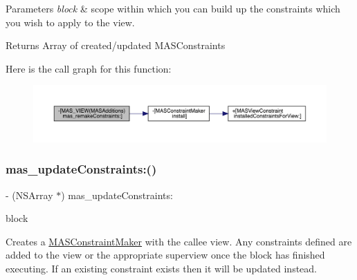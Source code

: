 \begin{DoxyParams}{Parameters}
{\em block} & scope within which you can build up the constraints which you wish to apply to the view.\\
\hline
\end{DoxyParams}
\begin{DoxyReturn}{Returns}
Array of created/updated M\+A\+S\+Constraints 
\end{DoxyReturn}
Here is the call graph for this function\+:\nopagebreak
\begin{figure}[H]
\begin{center}
\leavevmode
\includegraphics[width=350pt]{category_m_a_s___v_i_e_w_07_m_a_s_additions_08_a694b415beed5f32c5d1215f988bca6d0_cgraph}
\end{center}
\end{figure}
\mbox{\label{category_m_a_s___v_i_e_w_07_m_a_s_additions_08_a7e717094d6073368dc2d3e8a56377e84}} 
\subsubsection{\texorpdfstring{mas\+\_\+update\+Constraints\+:()}{mas\_updateConstraints:()}}
{\footnotesize\ttfamily -\/ (N\+S\+Array $\ast$) mas\+\_\+update\+Constraints\+: \begin{DoxyParamCaption}\item[{(void($^\wedge$)(\mbox{\hyperlink{interface_m_a_s_constraint_maker}{M\+A\+S\+Constraint\+Maker}} $\ast$make))}]{block }\end{DoxyParamCaption}}

Creates a \mbox{\hyperlink{interface_m_a_s_constraint_maker}{M\+A\+S\+Constraint\+Maker}} with the callee view. Any constraints defined are added to the view or the appropriate superview once the block has finished executing. If an existing constraint exists then it will be updated instead.


